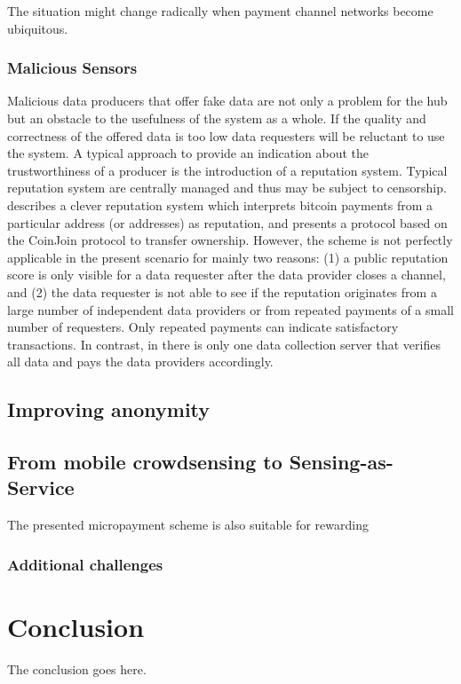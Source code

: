 The situation might change radically when payment channel networks become ubiquitous.  

\subsubsection{Malicious Sensors}

Malicious data producers that offer fake data are not only a problem for the hub but an obstacle to the usefulness of the system as a whole. If the quality and correctness of the offered data is too low data requesters will be reluctant to use the system.
A typical approach to provide an indication about the trustworthiness of a producer is the introduction of a reputation system. Typical reputation system are centrally managed and thus may be subject to censorship. \cite{s16060776} describes a clever reputation system which interprets bitcoin payments from a particular address (or addresses) as reputation, and presents a protocol based on the CoinJoin protocol to transfer ownership. However, the scheme is not perfectly applicable in the present scenario for mainly two reasons: (1) a public reputation score is only visible for a data requester after the data provider closes a channel, and (2) the data requester is not able to see if the reputation originates from a large number of independent data providers or from repeated payments of a small number of requesters. Only repeated payments can indicate satisfactory transactions. In contrast, in \cite{s16060776} there is only one data collection server that verifies all data and pays the data providers accordingly.

\subsection{Improving anonymity}


\subsection{From mobile crowdsensing to Sensing-as-Service}

The presented micropayment scheme is also suitable for rewarding 

\subsubsection{Additional challenges}



\section{Conclusion}
The conclusion goes here.
